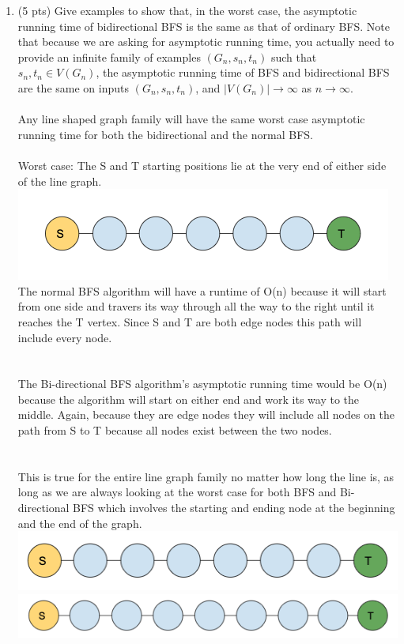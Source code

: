 \documentclass[12pt]{article}
\begin{document}
\begin{enumerate}
	\begin{enumerate}
	\item \label{1a} (5 pts) Give examples to show that, in the worst case, the asymptotic running time of bidirectional BFS is the same as that of ordinary BFS. Note that because we are asking for asymptotic running time, you actually need to provide an infinite family of examples $(G_n, s_n, t_n)$ such that $s_n,t_n \in V(G_n)$, the asymptotic running time of BFS and bidirectional BFS are the same on inputs $(G_n, s_n, t_n)$, and $|V(G_n)| \to \infty$ as $n \to \infty$.
	\\
	\\
	Any line shaped graph family will have the same worst case asymptotic running time for both the bidirectional and the normal BFS. 
	\\
	\\
	Worst case: The S and T starting positions lie at the very end of either side of the line graph.
	\\
	\includegraphics[scale=0.5]{problem1apic1.png}
	\\
	The normal BFS algorithm will have a runtime of O(n) because it will start from one side and travers its way through all the way to the right until it reaches the T vertex. Since S and T are both edge nodes this path will include every node.
	\\
	\\
	\\The Bi-directional BFS algorithm's asymptotic running time would be O(n) because the algorithm will start on either end and work its way to the middle. Again, because they are edge nodes they will include all nodes on the path from S to T because all nodes exist between the two nodes.
	\\
	\\
	\\This is true for the entire line graph family no matter how long the line is, as long as we are always looking at the worst case for both BFS and Bi-directional BFS which involves the starting and ending node at the beginning and the end of the graph. 
	\\
	\includegraphics[scale=0.5]{problem1apic2.png}
	\\
	\includegraphics[scale=0.5]{problem1apic3.png}
	\\
	

\end{enumerate}
\end{enumerate}
\end{document}
